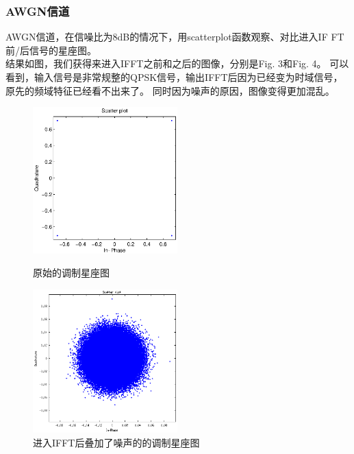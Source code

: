 \documentclass{article}
\begin{document}
\subsubsection{AWGN信道}
AWGN信道，在信噪比为8dB的情况下，用scatterplot函数观察、对比进入IF
FT前/后信号的星座图。\\
结果如图，我们获得来进入IFFT之前和之后的图像，分别是Fig. 3和Fig. 4。
可以看到，输入信号是非常规整的QPSK信号，输出IFFT后因为已经变为时域信号，原先的频域特征已经看不出来了。
同时因为噪声的原因，图像变得更加混乱。
\begin{figure}[h]
\begin{minipage}[t]{0.5\linewidth}
\centering
\includegraphics[width=2.2in]{1.eps}
\caption{原始的调制星座图}
\label{fig:side:a}
\end{minipage}%
\begin{minipage}[t]{0.5\linewidth}
\centering
\includegraphics[width=2.2in]{4.eps}
\caption{进入IFFT后叠加了噪声的的调制星座图}
\label{fig:side:b}
\end{minipage}
\end{figure}
\end{document}
